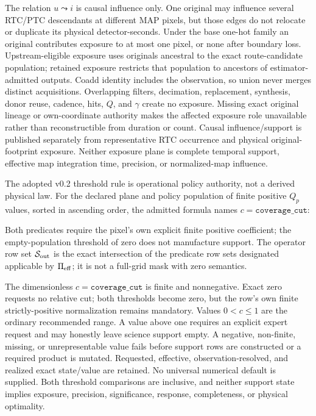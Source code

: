 \documentclass[10pt]{article}
\begin{document}
\SCIMapExposureEquations

The relation \(u\leadsto i\) is causal influence only. One original may
influence several RTC/PTC descendants at different MAP pixels, but those
edges do not relocate or duplicate its physical detector-seconds. Under the
base one-hot family an original contributes exposure to at most one pixel, or
none after boundary loss. Upstream-eligible exposure uses originals ancestral
to the exact route-candidate population; retained exposure restricts that
population to ancestors of estimator-admitted outputs. Coadd identity includes
the observation, so union never merges distinct acquisitions. Overlapping
filters, decimation, replacement, synthesis, donor reuse, cadence, hits,
\(Q\), and \(\gamma\) create no exposure. Missing exact original lineage or
own-coordinate authority makes the affected exposure role unavailable rather
than reconstructible from duration or count. Causal influence/support is
published separately from representative RTC occurrence and physical
original-footprint exposure. Neither exposure plane is complete temporal
support, effective map integration time, precision, or normalized-map
influence.

The adopted v0.2 threshold rule is operational policy authority, not a derived
physical law. For the declared plane and policy population of finite positive \(Q_p\)
values, sorted in ascending order, the admitted formula names
\(c=\texttt{coverage\_cut}\):

\SCIMapThresholdEquations

Both predicates require the pixel's own explicit finite positive coefficient;
the empty-population threshold of zero does not manufacture support. The
operator row set \(\mathcal S_{\rm out}\) is the exact intersection of the
predicate row sets designated applicable by \(\Pi_{\rm eff}\); it is not a
full-grid mask with zero semantics.

The dimensionless \(c=\texttt{coverage\_cut}\) is finite and nonnegative.
Exact zero requests no relative cut; both thresholds become zero, but the
row's own finite strictly-positive normalization remains mandatory. Values
\(0<c\le1\) are the ordinary recommended range. A value above one requires an
explicit expert request and may honestly leave science support empty. A
negative, non-finite, missing, or unrepresentable value fails before support
rows are constructed or a required product is mutated. Requested, effective,
observation-resolved, and realized exact state/value are retained. No
universal numerical default is supplied. Both threshold comparisons are
inclusive, and neither support state implies exposure, precision,
significance, response, completeness, or physical optimality.
\end{document}
